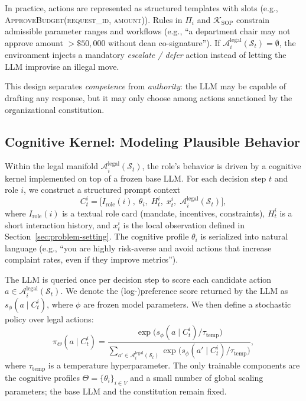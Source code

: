 \documentclass{article}
\begin{document}
In practice, actions are represented as structured templates with slots (e.g., \textsc{ApproveBudget(request\_id, amount)}).
Rules in $\Pi_i$ and $\mathcal{K}_{\text{SOP}}$ constrain admissible parameter ranges and workflows (e.g., “a department chair may not approve amount $>\$50{,}000$ without dean co-signature”).
If $\mathcal{A}^{\text{legal}}_i(\mathcal{S}_t)=\emptyset$, the environment injects a mandatory \emph{escalate / defer} action instead of letting the LLM improvise an illegal move.

This design separates \emph{competence} from \emph{authority}: the LLM may be capable of drafting any response, but it may only choose among actions sanctioned by the organizational constitution.

\subsection{Cognitive Kernel: Modeling Plausible Behavior}
\label{sec:cognitive-kernel}

Within the legal manifold $\mathcal{A}^{\text{legal}}_i(\mathcal{S}_t)$, the role’s behavior is driven by a cognitive kernel implemented on top of a frozen base LLM.
For each decision step $t$ and role $i$, we construct a structured prompt context
\begin{equation}
    C_t^i = \big[ I_{\text{role}}(i),\; \theta_i,\; H_t^i,\; x_t^i,\; \mathcal{A}^{\text{legal}}_i(\mathcal{S}_t) \big],
\end{equation}
where $I_{\text{role}}(i)$ is a textual role card (mandate, incentives, constraints), $H_t^i$ is a short interaction history, and $x_t^i$ is the local observation defined in Section~\ref{sec:problem-setting}.
The cognitive profile $\theta_i$ is serialized into natural language (e.g., “you are highly risk-averse and avoid actions that increase complaint rates, even if they improve metrics”).

The LLM is queried once per decision step to score each candidate action $a \in \mathcal{A}^{\text{legal}}_i(\mathcal{S}_t)$.
We denote the (log-)preference score returned by the LLM as $s_{\phi}(a \mid C_t^i)$, where $\phi$ are frozen model parameters.
We then define a stochastic policy over legal actions:
\begin{equation}
    \pi_{\Theta}(a \mid C_t^i)
    =
    \frac{\exp\big( s_{\phi}(a \mid C_t^i) / \tau_{\text{temp}} \big)}
         {\sum_{a' \in \mathcal{A}^{\text{legal}}_i(\mathcal{S}_t)}
          \exp\big( s_{\phi}(a' \mid C_t^i) / \tau_{\text{temp}} \big)},
    \label{eq:policy}
\end{equation}
where $\tau_{\text{temp}}$ is a temperature hyperparameter.
The only trainable components are the cognitive profiles $\Theta = \{\theta_i\}_{i \in V}$ and a small number of global scaling parameters; the base LLM and the constitution remain fixed.
\end{document}
